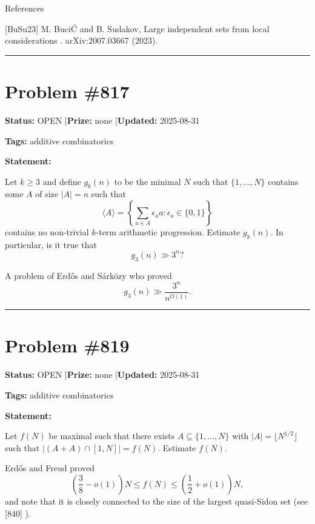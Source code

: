 \documentclass{article}
\begin{document}
References

[BuSu23] M. Buci\'C and B. Sudakov, Large independent sets from local considerations . arXiv:2007.03667 (2023).

\noindent\rule{\linewidth}{0.4pt}


\section{Problem \#817}
\label{prob:817}

\noindent\textbf{Status:} OPEN \quad|\quad \textbf{Prize:} none \quad|\quad \textbf{Updated:} 2025-08-31

\noindent\textbf{Tags:} additive combinatorics

\medskip

\noindent\textbf{Statement:}

Let $k\geq 3$ and define $g_k(n)$ to be the minimal $N$ such that $\{1,\ldots,N\}$ contains some $A$ of size $\lvert A\rvert=n$ such that\[\langle A\rangle = \left\{\sum_{a\in A}\epsilon_aa: \epsilon_a\in \{0,1\}\right\}\]contains no non-trivial $k$-term arithmetic progression. Estimate $g_k(n)$. In particular, is it true that\[g_3(n) \gg 3^n?\]




A problem of Erd\H{o}s and S\'{a}rk\"{o}zy who proved\[g_3(n) \gg \frac{3^n}{n^{O(1)}}.\]

\noindent\rule{\linewidth}{0.4pt}


\section{Problem \#819}
\label{prob:819}

\noindent\textbf{Status:} OPEN \quad|\quad \textbf{Prize:} none \quad|\quad \textbf{Updated:} 2025-08-31

\noindent\textbf{Tags:} additive combinatorics

\medskip

\noindent\textbf{Statement:}

Let $f(N)$ be maximal such that there exists $A\subseteq \{1,\ldots,N\}$ with $\lvert A\rvert=\lfloor N^{1/2}\rfloor$ such that $\lvert (A+A)\cap [1,N]\rvert=f(N)$. Estimate $f(N)$.




Erd\H{o}s and Freud \cite{ErFr91} proved\[\left(\frac{3}{8}-o(1)\right)N \leq f(N) \leq \left(\frac{1}{2}+o(1)\right)N,\]and note that it is closely connected to the size of the largest quasi-Sidon set (see [840] ).
\end{document}
